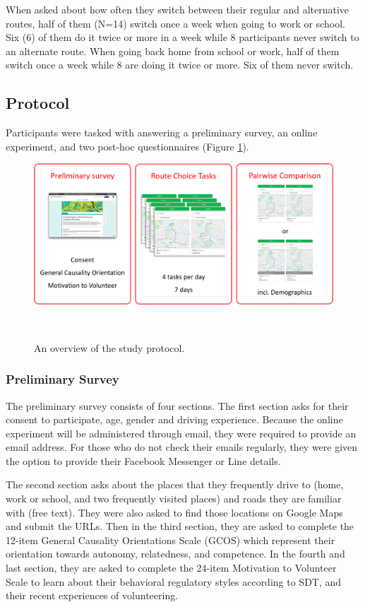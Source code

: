 When asked about how often they switch between their regular and alternative routes, half of them (N=14) switch once a week when going to work or school. Six (6) of them do it twice or more in a week while 8 participants never switch to an alternate route. When going back home from school or work, half of them switch once a week while 8 are doing it twice or more. Six of them never switch. 

\subsection{Protocol}
Participants were tasked with answering a preliminary survey, an online experiment, and two post-hoc questionnaires (Figure \ref{fig:s3-protocol}). 

\begin{figure}[h]
\centering
  \includegraphics[scale=0.5]{figures/s3-protocol.png}
  \caption{An overview of the study protocol.}~\label{fig:s3-protocol}
\end{figure}

\subsubsection{Preliminary Survey}
The preliminary survey consists of four sections. The first section asks for their consent to participate, age, gender and driving experience. Because the online experiment will be administered through email, they were required to provide an email address. For those who do not check their emails regularly, they were given the option to provide their Facebook Messenger or Line details.

The second section asks about the places that they frequently drive to (home, work or school, and two frequently visited places) and roads they are familiar with (free text). They were also asked to find those locations on Google Maps and submit the URLs. Then in the third section, they are asked to complete the 12-item General Causality Orientations Scale (GCOS) which represent their orientation towards autonomy, relatedness, and competence. In the fourth and last section, they are asked to complete the 24-item Motivation to Volunteer Scale to learn about their behavioral regulatory styles according to SDT, and their recent experiences of volunteering. 

